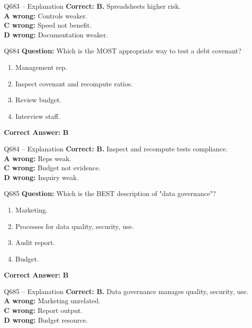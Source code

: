 \documentclass[aspectratio=169,10pt]{beamer}
\begin{document}
	\begin{frame}[t]{Q683 -- Explanation}
		\small
		\textbf{Correct: B.} Spreadsheets higher risk. \\[4pt]
		\textbf{A wrong:} Controls weaker. \\[2pt]
		\textbf{C wrong:} Speed not benefit. \\[2pt]
		\textbf{D wrong:} Documentation weaker.
	\end{frame}
	
	\begin{frame}[t]{Q684}
		\small
		\textbf{Question:} Which is the MOST appropriate way to test a debt covenant?
		\begin{enumerate}[label=\Alph*.,itemsep=1pt,topsep=2pt]
			\item Management rep.
			\item Inspect covenant and recompute ratios.
			\item Review budget.
			\item Interview staff.
		\end{enumerate}
		\vspace{4pt}
		\textbf{Correct Answer: B}
	\end{frame}
	
	\begin{frame}[t]{Q684 -- Explanation}
		\small
		\textbf{Correct: B.} Inspect and recompute tests compliance. \\[4pt]
		\textbf{A wrong:} Reps weak. \\[2pt]
		\textbf{C wrong:} Budget not evidence. \\[2pt]
		\textbf{D wrong:} Inquiry weak.
	\end{frame}
	
	\begin{frame}[t]{Q685}
		\small
		\textbf{Question:} Which is the BEST description of "data governance"?
		\begin{enumerate}[label=\Alph*.,itemsep=1pt,topsep=2pt]
			\item Marketing.
			\item Processes for data quality, security, use.
			\item Audit report.
			\item Budget.
		\end{enumerate}
		\vspace{4pt}
		\textbf{Correct Answer: B}
	\end{frame}
	
	\begin{frame}[t]{Q685 -- Explanation}
		\small
		\textbf{Correct: B.} Data governance manages quality, security, use. \\[4pt]
		\textbf{A wrong:} Marketing unrelated. \\[2pt]
		\textbf{C wrong:} Report output. \\[2pt]
		\textbf{D wrong:} Budget resource.
	\end{frame}
	
\end{document}
